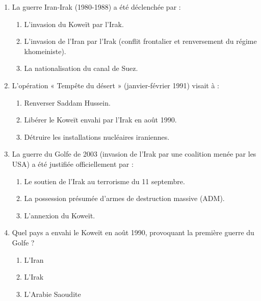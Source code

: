 \documentclass[11pt]{article}
\begin{document}
\begin{exercice}
\begin{enumerate}
    \item La guerre Iran-Irak (1980-1988) a été déclenchée par :
    \begin{enumerate}
        \item L'invasion du Koweït par l'Irak.
        \item L'invasion de l'Iran par l'Irak (conflit frontalier et renversement du régime khomeiniste).
        \item La nationalisation du canal de Suez.
    \end{enumerate}
    \item L'opération « Tempête du désert » (janvier-février 1991) visait à :
    \begin{enumerate}
        \item Renverser Saddam Hussein.
        \item Libérer le Koweït envahi par l'Irak en août 1990.
        \item Détruire les installations nucléaires iraniennes.
    \end{enumerate}
    \item La guerre du Golfe de 2003 (invasion de l'Irak par une coalition menée par les USA) a été justifiée officiellement par :
    \begin{enumerate}
        \item Le soutien de l'Irak au terrorisme du 11 septembre.
        \item La possession présumée d'armes de destruction massive (ADM).
        \item L'annexion du Koweït.
    \end{enumerate}
    \item Quel pays a envahi le Koweït en août 1990, provoquant la première guerre du Golfe ?
    \begin{enumerate}
        \item L'Iran
        \item L'Irak
        \item L'Arabie Saoudite
    \end{enumerate}
\end{enumerate}
\end{exercice}
\end{document}
